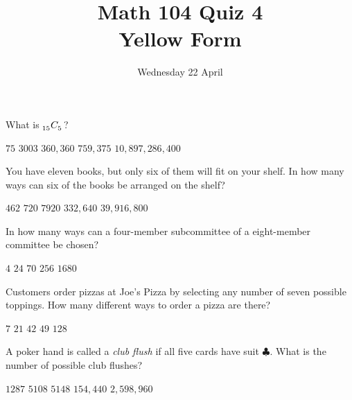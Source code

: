 \documentclass[answers,12pt]{exam}
\title{Math 104 Quiz 4\\Yellow Form}
\date{Wednesday 22 April}
\newcommand\ncr[2]{\tensor[_{#1}]C{_{#2}}}
\begin{document}
\maketitle
\thispagestyle{empty}
\begin{center}
\end{center}

\begin{questions}

\question What is $\ncr{15}{5}$?\\
\begin{oneparchoices}
\choice $75$ %
\correctchoice $3003$
\choice $360,360$ %
\choice $759,375$ %
\choice $10,897,286,400$ %
\end{oneparchoices}

\question You have eleven books, but only six
of them will fit on your shelf. In how many 
ways can six of the books be arranged on the shelf?\\
\begin{oneparchoices}
\choice $462$ %
\choice $720$ %
\choice $7920$ %
\correctchoice $332,640$
\choice $39,916,800$ %
\end{oneparchoices}

\question In how many ways can a four-member subcommittee
of a eight-member committee be chosen?\\
\begin{oneparchoices}
\choice $4$ %
\choice $24$ %
\correctchoice $70$
\choice $256$ %
\choice $1680$ %
\end{oneparchoices}

\question Customers order pizzas at Joe's Pizza
by selecting any number of seven possible toppings.
How many different ways to order a pizza are there?\\
\begin{oneparchoices}
\choice $7$ %
\choice $21$ %
\choice $42$ %
\choice $49$ %
\correctchoice $128$
\end{oneparchoices}

\question A poker hand is called a {\em club flush}
if all five cards have suit $\clubsuit$. What is
the number of possible club flushes?\\
\begin{oneparchoices}
\correctchoice $1287$
\choice $5108$ %
\choice $5148$ %
\choice $154,440$ %
\choice $2,598,960$ %
\end{oneparchoices}


\end{questions}
\end{document}
